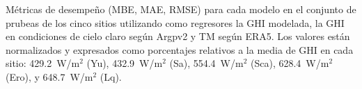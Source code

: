 \documentclass[letterpaper,12pt, twoside]{report}
\providecommand{\DIFdeltex}[1]{{\protect\color{red} \scriptsize #1}} %
\providecommand{\DIFdelFL}[1]{\DIFdel{#1}} %
\providecommand{\DIFdel}[1]{\texorpdfstring{\DIFdeltex{#1}}{}} %
\begin{document}
{%
\DIFdelFL{Métricas de desempeño (MBE, MAE, RMSE) para cada modelo en el conjunto de prubeas de los cinco sitios utilizando como regresores la GHI modelada, la GHI en condiciones de cielo claro según Argpv2 y TM según ERA5. Los valores están normalizados y expresados como porcentajes relativos a la media de GHI en cada sitio: 429.2~W/m$^2$ (Yu), 432.9~W/m$^2$ (Sa), 554.4~W/m$^2$ (Sca), 628.4~W/m$^2$ (Ero), y 648.7~W/m$^2$ (Lq).}}


\end{document}
